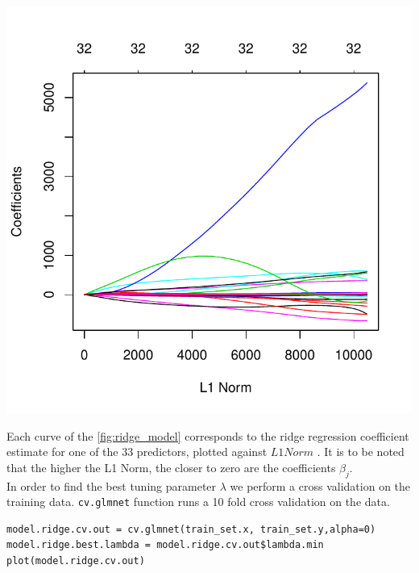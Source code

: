 \documentclass[]{report}
\begin{document}
\begin{center}
	\includegraphics[width=0.8\linewidth]{Figures/ridge_model.pdf}
	\label{fig:ridge_model}
\end{center}

Each curve of the \ref{fig:ridge_model} corresponds to the ridge regression coefficient estimate for one of the 33 predictors, plotted against $L1 Norm$ . It is to be noted that the higher the L1 Norm, the closer to zero are the coefficients $\beta_{j}$.\\


In order to find the best tuning parameter $\lambda$ we perform a cross validation on the training data. \texttt{cv.glmnet} function runs a 10 fold cross validation on the data.

\begin{lstlisting}
model.ridge.cv.out = cv.glmnet(train_set.x, train_set.y,alpha=0)
model.ridge.best.lambda = model.ridge.cv.out$lambda.min
plot(model.ridge.cv.out)
\end{lstlisting}
\end{document}
